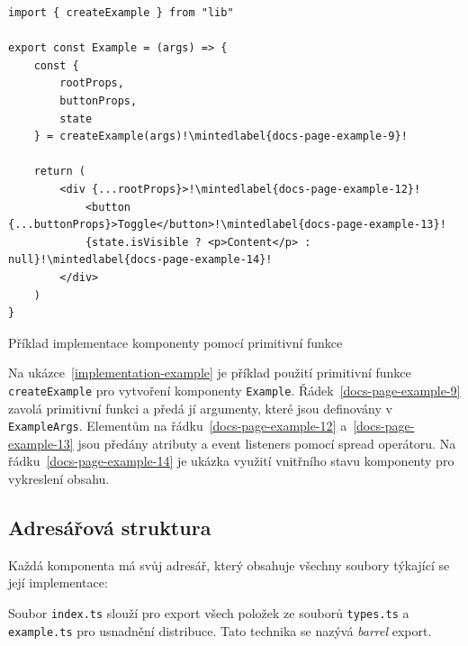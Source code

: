 \begin{listing}[!ht]
    \begin{verbatim}
import { createExample } from "lib"

export const Example = (args) => {
    const {
        rootProps,
        buttonProps,
        state
    } = createExample(args)!\mintedlabel{docs-page-example-9}!

    return (
        <div {...rootProps}>!\mintedlabel{docs-page-example-12}!
            <button {...buttonProps}>Toggle</button>!\mintedlabel{docs-page-example-13}!
            {state.isVisible ? <p>Content</p> : null}!\mintedlabel{docs-page-example-14}!
        </div>
    )
}
\end{verbatim}
    \caption{Příklad implementace komponenty pomocí primitivní funkce}
    \label{implementation-example}
\end{listing}

Na ukázce~\ref{implementation-example} je příklad použití primitivní funkce \texttt{createExample} pro vytvoření komponenty \texttt{Example}.
Řádek~\ref{docs-page-example-9} zavolá primitivní funkci a předá jí argumenty, které jsou definovány v \texttt{ExampleArgs}.
Elementům na řádku~\ref{docs-page-example-12} a~\ref{docs-page-example-13} jsou předány atributy a event listeners pomocí spread operátoru.
Na řádku~\ref{docs-page-example-14} je ukázka využití vnitřního stavu komponenty pro vykreslení obsahu.

\subsection{Adresářová struktura}

Každá komponenta má svůj adresář, který obsahuje všechny soubory týkající se její implementace:

\vspace{11pt}


\vspace{11pt}

Soubor \texttt{index.ts} slouží pro export všech položek ze souborů \texttt{types.ts} a \texttt{example.ts} pro usnadnění distribuce.
Tato technika se nazývá \textit{barrel} export.

\clearpage

